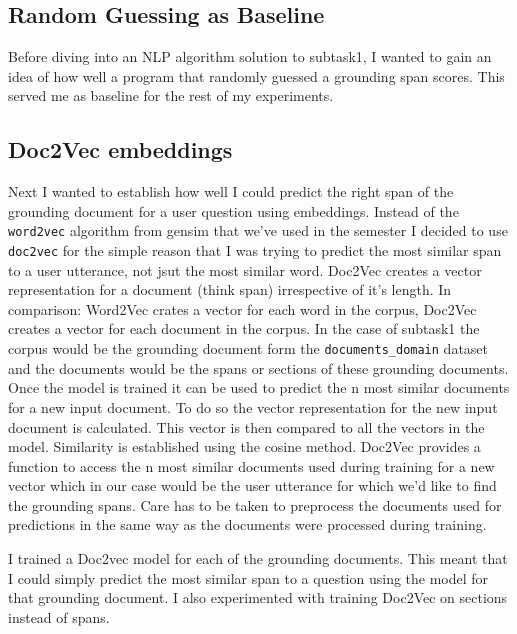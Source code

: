 \documentclass[11pt]{article}
\begin{document}
    \subsection{Random Guessing as Baseline}\label{subsec:random-guessing-method}
    Before diving into an NLP algorithm solution to subtask1, I wanted to gain an idea of how well a program that randomly guessed a
    grounding span scores. This served me as baseline for the rest of my experiments.

    \subsection{Doc2Vec embeddings}\label{subsec:doc2vc-method}
    Next I wanted to establish how well I could predict the right span of the grounding document for a user question using
    embeddings. Instead of the \texttt{word2vec} algorithm from gensim that we've used in the semester I decided to use
    \texttt{doc2vec} \cite{doc2vec} for the simple reason that I was trying to predict the most similar span to a user utterance, not jsut
    the most similar word. Doc2Vec creates a vector representation for a document (think span) irrespective of it's length.
    In comparison: Word2Vec crates a vector for each word in the corpus, Doc2Vec creates a vector for each document in the corpus.
    In the case of subtask1 the corpus would be the grounding document form the \texttt{documents\_domain} dataset
    and the documents would be the spans or sections of these grounding documents. Once the model is trained
    it can be used to predict the n most similar documents for a new input document. To do so the vector representation
    for the new input document is calculated. This vector is then compared to all the vectors in the model. Similarity
    is established using the cosine method. Doc2Vec provides a function to access the n most similar documents used during training
    for a new vector which in our case would be the user utterance for which we'd like to find the grounding spans.
    Care has to be taken to preprocess the documents used for predictions in
    the same way as the documents were processed during training.

    I trained a Doc2vec model for each of the grounding documents. This meant that I could simply predict
    the most similar span to a question using the model for that grounding document. I also experimented with training Doc2Vec on
    sections instead of spans.
\end{document}
